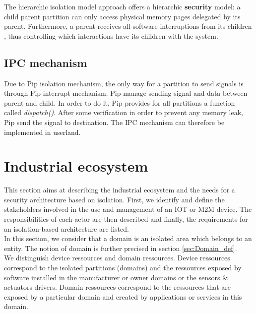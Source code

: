 \documentclass[conference]{IEEEtran}
\begin{document}
The hierarchic isolation model approach offers a hierarchic \textbf{security} model: a child parent partition can only access physical memory pages delegated by its parent. Furthermore, a parent receives all software interruptions from its children%
, thus controlling which interactions have its children with the system.

\subsection{IPC mechanism}

Due to Pip isolation mechanism, the only way for a partition to send signals is through Pip interrupt mechanism. Pip manage sending signal and data between parent and child. In order to do it, Pip provides for all partitions a function called \textit{dispatch()}. After some verification in order to prevent any memory leak, Pip send the signal to destination. The IPC mechanism can therefore be implemented in userland.



\section{Industrial ecosystem}
\label{sec:Industrial_ecosystem}
This section aims at describing the industrial ecosystem and the needs for a security architecture based on isolation. First, we identify and define the stakeholders involved in the use and management of an IOT or M2M device. The responsibilities of each actor are then described and finally, the requirements for an isolation-based architecture are listed.\\

In this section, we consider that a domain is an isolated area which belongs to an entity. The notion of domain is further precised in section \ref{sec:Domain_def}.\\

We distinguish device ressources and domain ressources. Device ressources correspond to the isolated partitions (domains) and the ressources exposed by software installed in the manufacturer or owner domains or the sensors \& actuators drivers. Domain ressources correspond to the ressources that are exposed by a particular domain and created by applications or services in this domain.\\
\end{document}
